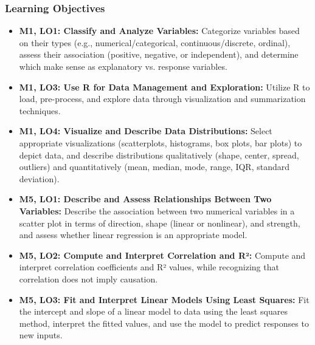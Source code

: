 \begin{frame}
    \frametitle{Learning Objectives}
    \begin{itemize}
        \item \textbf{M1, LO1: Classify and Analyze Variables:} Categorize variables based on their types (e.g., numerical/categorical, continuous/discrete, ordinal), assess their association (positive, negative, or independent), and determine which make sense as explanatory vs. response variables.
        \item \textbf{M1, LO3: Use R for Data Management and Exploration:} Utilize R to load, pre-process, and explore data through visualization and summarization techniques.
        \item \textbf{M1, LO4: Visualize and Describe Data Distributions:} Select appropriate visualizations (scatterplots, histograms, box plots, bar plots) to depict data, and describe distributions qualitatively (shape, center, spread, outliers) and quantitatively (mean, median, mode, range, IQR, standard deviation).
        \item \textbf{M5, LO1: Describe and Assess Relationships Between Two Variables:} Describe the association between two numerical variables in a scatter plot in terms of direction, shape (linear or nonlinear), and strength, and assess whether linear regression is an appropriate model.    
        \item \textbf{M5, LO2: Compute and Interpret Correlation and R²:} Compute and interpret correlation coefficients and R² values, while recognizing that correlation does not imply causation. 
        \item \textbf{M5, LO3: Fit and Interpret Linear Models Using Least Squares:} Fit the intercept and slope of a linear model to data using the least squares method, interpret the fitted values, and use the model to predict responses to new inputs.
    \end{itemize}
\end{frame}
    
